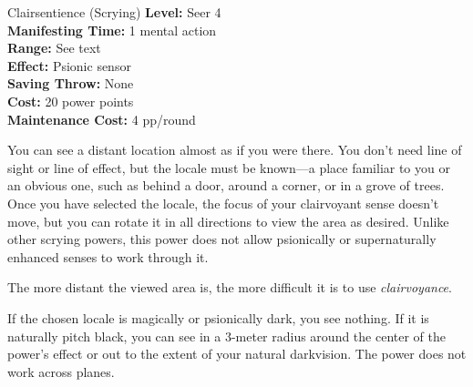 {Clairsentience (Scrying)}
{
	\textbf{Level:}
	Seer 4\\
	\textbf{Manifesting Time:}
	1 mental action\\
	\textbf{Range:}
	See text\\
	\textbf{Effect:}
	Psionic sensor\\
	\textbf{Saving Throw:}
	None\\
	\textbf{Cost:}
	20 power points\\
	\textbf{Maintenance Cost:}
	4 pp/round\\
}
{
	You can see a distant location almost as if you were there. You don't need line of sight or line of effect, but the locale must be known---a place familiar to you or an obvious one, such as behind a door, around a corner, or in a grove of trees. Once you have selected the locale, the focus of your clairvoyant sense doesn't move, but you can rotate it in all directions to view the area as desired. Unlike other scrying powers, this power does not allow psionically or supernaturally enhanced senses to work through it.

	The more distant the viewed area is, the more difficult it is to use \emph{clairvoyance}.


	If the chosen locale is magically or psionically dark, you see nothing. If it is naturally pitch black, you can see in a 3-meter radius around the center of the power's effect or out to the extent of your natural darkvision. The power does not work across planes. 
}